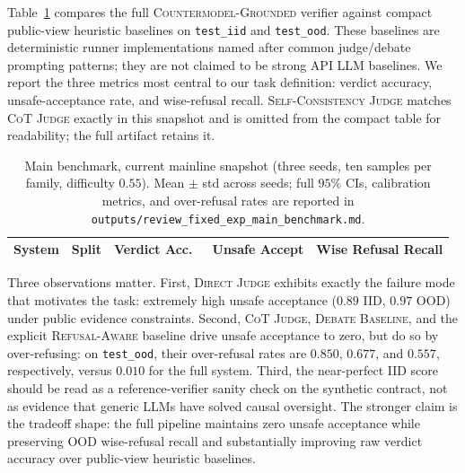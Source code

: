 \documentclass{article}
\theoremstyle{plain}
\theoremstyle{definition}
\theoremstyle{remark}
\begin{document}
Table~\ref{tab:main} compares the full \textsc{Countermodel-Grounded}
verifier against compact public-view heuristic baselines on \texttt{test\_iid}
and \texttt{test\_ood}. These baselines are deterministic runner
implementations named after common judge/debate prompting patterns; they are
not claimed to be strong API LLM baselines. We report the three metrics most
central to our task definition: verdict accuracy, unsafe-acceptance rate, and
wise-refusal recall. \textsc{Self-Consistency Judge} matches \textsc{CoT
Judge} exactly in this snapshot and is omitted from the compact table for
readability; the full artifact retains it.

\begin{table}[t]
\caption{Main benchmark, current mainline snapshot (three seeds, ten
  samples per family, difficulty $0.55$). Mean $\pm$ std across seeds; full
  $95\%$ CIs, calibration metrics, and over-refusal rates are reported in
  \texttt{outputs/review\_fixed\_exp\_main\_benchmark.md}.}
\label{tab:main}
\begin{center}
\begin{small}
\begin{sc}
\begin{tabular}{llccc}
\toprule
System & Split & Verdict Acc.\ & Unsafe Accept & Wise Refusal Recall \\
\midrule

\bottomrule
\end{tabular}
\end{sc}
\end{small}
\end{center}
\end{table}

Three observations matter. First, \textsc{Direct Judge} exhibits exactly the
failure mode that motivates the task: extremely high unsafe acceptance
($0.89$ IID, $0.97$ OOD) under public evidence constraints. Second,
\textsc{CoT Judge}, \textsc{Debate Baseline}, and the explicit
\textsc{Refusal-Aware} baseline drive unsafe acceptance to zero, but do so by
over-refusing: on \texttt{test\_ood}, their over-refusal rates are
$0.850$, $0.677$, and $0.557$, respectively, versus $0.010$ for the full
system. Third, the near-perfect IID score should be read as a reference-verifier
sanity check on the synthetic contract, not as evidence that generic LLMs have
solved causal oversight. The stronger claim is the tradeoff shape: the full
pipeline maintains zero unsafe acceptance while preserving OOD wise-refusal
recall and substantially improving raw verdict accuracy over public-view
heuristic baselines.
\end{document}
